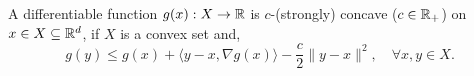 \begin{definition}[$c$-concavity]
\label{def:concave}
A differentiable function $g(x): X \to \mathbb{R}$ is $c$-(strongly) concave ($c \in \mathbb{R}_+$) on $x \in X \subseteq \mathbb{R}^d$, if $X$ is a convex set and,
\begin{equation}
\label{eq:concave}
    g(y) \le g(x) + \langle y-x, \nabla g(x)\rangle - \frac{c}{2}\| y - x \|^2, \quad \forall x,y\in X.
\end{equation}
\end{definition}